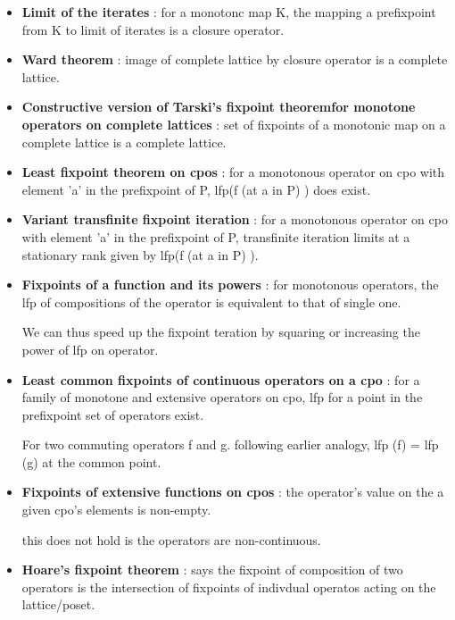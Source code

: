 \begin{itemize}
	\item{\textbf{Limit of the iterates } : for a monotonc map K, the mapping a prefixpoint from K to limit of iterates is a closure operator.
	}

	\item{\textbf{Ward theorem} : image of complete lattice by closure operator is a complete lattice. 
	}

	\item{\textbf{Constructive version of Tarski’s fixpoint theoremfor monotone operators on complete lattices } : set of fixpoints of a monotonic map on a complete lattice is a complete lattice.
	}

	\item{\textbf{Least fixpoint theorem on cpos} : for a monotonous operator on cpo with element 'a' in the prefixpoint of P, lfp(f (at a in P) ) does exist.
	}


	\item{\textbf{Variant transfinite fixpoint iteration} : for a monotonous operator on cpo with element 'a' in the prefixpoint of P, transfinite iteration limits at a stationary rank given by lfp(f (at a in P) ).
	}
	
	\item{\textbf{Fixpoints of a function and its powers} : for monotonous operators, the lfp of compositions of the operator is equivalent to that of single one.

	We can thus speed up the fixpoint teration by squaring or increasing the power of lfp on operator.
	}

	\item{\textbf{Least common fixpoints of continuous operators on a cpo} :
	for a family of monotone and extensive operators on cpo, lfp for a point in the prefixpoint set of operators exist.

	For two commuting operators f and g. following earlier analogy, lfp (f) = lfp (g) at the common point.

	}

	\item{\textbf{Fixpoints of extensive functions on cpos} : the operator's value on the a given cpo's elements is non-empty.

	this does not hold is the operators are non-continuous.

	}

	\item{\textbf{Hoare's fixpoint theorem} : says the fixpoint of composition of two operators is the intersection of fixpoints of indivdual operatos acting on the lattice/poset.
	}


\end{itemize}
